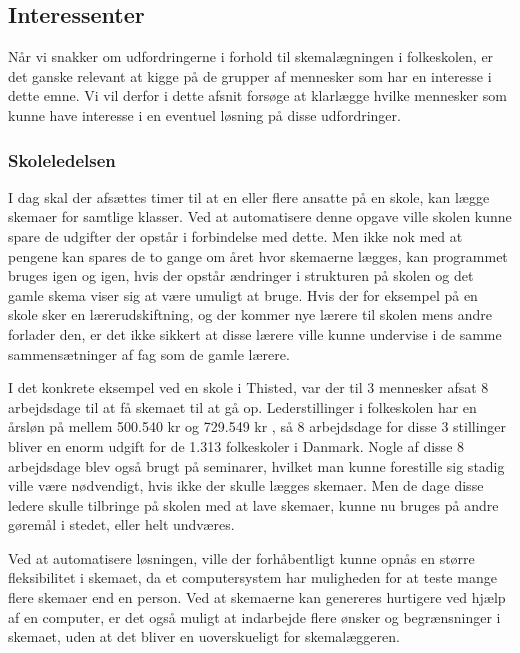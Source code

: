\subsection{Interessenter}
Når vi snakker om udfordringerne i forhold til skemalægningen i folkeskolen, er det ganske relevant at kigge på de grupper af mennesker som har en interesse i dette emne. Vi vil derfor i dette afsnit forsøge at klarlægge hvilke mennesker som kunne have interesse i en eventuel løsning på disse udfordringer.

\subsubsection{Skoleledelsen}

I dag skal der afsættes timer til at en eller flere ansatte på en skole, kan lægge skemaer for samtlige klasser. Ved at automatisere denne opgave ville skolen kunne spare de udgifter der opstår i forbindelse med dette. Men ikke nok med at pengene kan spares de to gange om året hvor skemaerne lægges, kan programmet bruges igen og igen, hvis der opstår ændringer i strukturen på skolen og det gamle skema viser sig at være umuligt at bruge. Hvis der for eksempel på en skole sker en lærerudskiftning, og der kommer nye lærere til skolen mens andre forlader den, er det ikke sikkert at disse lærere ville kunne undervise i de samme sammensætninger af fag som de gamle lærere.

I det konkrete eksempel ved en skole i Thisted, var der til 3 mennesker afsat 8 arbejdsdage til at få skemaet til at gå op. Lederstillinger i folkeskolen har en årsløn på mellem 500.540 kr og 729.549 kr \cite{TR_HAANDBOGEN}\cite{Statens_adm}, så 8 arbejdsdage for disse 3 stillinger bliver en enorm udgift for de 1.313 folkeskoler i Danmark\cite{UVM-Folkeskoler}. Nogle af disse 8 arbejdsdage blev også brugt på seminarer, hvilket man kunne forestille sig stadig ville være nødvendigt, hvis ikke der skulle lægges skemaer. Men de dage disse ledere skulle tilbringe på skolen med at lave skemaer, kunne nu bruges på andre gøremål i stedet, eller helt undværes.

Ved at automatisere løsningen, ville der forhåbentligt kunne opnås en større fleksibilitet i skemaet, da et computersystem har muligheden for at teste mange flere skemaer end en person. Ved at skemaerne kan genereres hurtigere ved hjælp af en computer, er det også muligt at indarbejde flere ønsker og begrænsninger i skemaet, uden at det bliver en uoverskueligt for skemalæggeren. 

